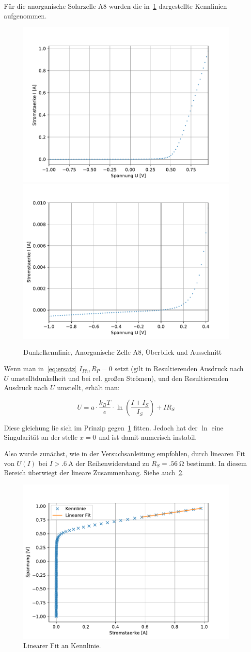 \documentclass[slug=SZ, room=Hermann-Krone-Bau\,\ Labor\ 1.25, supervisor=Martin\ Kroll]{../../Lab_Report_LaTeX/lab_report}
\begin{document}
F\"ur die anorganische Solarzelle A8 wurden die
in~\ref{fig:a-anorg-dunkel} dargestellte Kennlinien aufgenommen.
\begin{figure}[H]\centering
  \includegraphics[width=.5\columnwidth]{./figs/python/A/an_dark_all.pdf}
  \includegraphics[width=.5\columnwidth]{./figs/python/A/an_dark_close.pdf}
  \caption{Dunkelkennlinie, Anorganische Zelle A8, \"Uberblick und Ausschnitt}
  \label{fig:a-anorg-dunkel}
\end{figure}

Wenn man in~\ref{eq:ersatz} \(I_{Ph}, R_{P}=0\) setzt (gilt in
Resultierenden Ausdruck nach \(U\) umstelltdunkelheit und bei
rel. gro\ss{}en Str\"omen), und den Resultierenden Ausdruck nach \(U\)
umstellt, erh\"alt man:

\begin{equation}
  \label{eq:uofi}
  U=a\cdot\frac{k_BT}{e}\cdot\ln(\frac{I+I_S}{I_S})+IR_S
\end{equation}


Diese gleichung lie\sse{} sich im Prinzip gegen~\ref{fig:a-anorg-dunkel}
fitten. Jedoch hat der \(\ln\) eine Singularit\"at an der stelle
\(x=0\) und ist damit numerisch instabil.

Also wurde zun\"achst, wie in der Versuchsanleitung empfohlen, durch
linearen Fit von \(U(I)\) bei \(I>\SI{.6}{\ampere}\) der
Reihenwiderstand zu \(R_S=\SI{.56}{\ohm}\) bestimmt. In diesem Bereich
\"uberwiegt der lineare Zusammenhang. Siehe
auch~\ref{fig:a-anorg-lin}.

\begin{figure}[H]\centering
  \includegraphics[width=.5\columnwidth]{./figs/python/A/dark_an_lin_fit.pdf}
  \caption{Linearer Fit an Kennlinie.}
  \label{fig:a-anorg-lin}
\end{figure}
\end{document}
